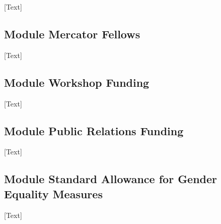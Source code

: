 [Text]

\subsection{Module Mercator Fellows}

[Text]

\subsection{Module Workshop Funding}

[Text]

\subsection{Module Public Relations Funding}

[Text]

\subsection{Module Standard Allowance for Gender Equality Measures}

[Text]



